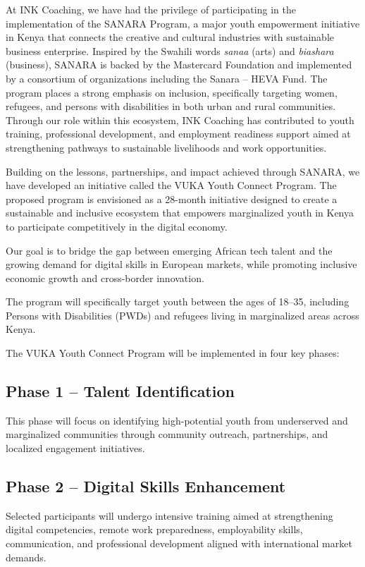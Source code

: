 \documentclass[11pt,a4paper]{article}
\begin{document}
\noindent At INK Coaching, we have had the privilege of participating in the implementation of the SANARA Program, a major youth empowerment initiative in Kenya that connects the creative and cultural industries with sustainable business enterprise. Inspired by the Swahili words \emph{sanaa} (arts) and \emph{biashara} (business), SANARA is backed by the Mastercard Foundation and implemented by a consortium of organizations including the Sanara -- HEVA Fund. The program places a strong emphasis on inclusion, specifically targeting women, refugees, and persons with disabilities in both urban and rural communities. Through our role within this ecosystem, INK Coaching has contributed to youth training, professional development, and employment readiness support aimed at strengthening pathways to sustainable livelihoods and work opportunities.

\noindent Building on the lessons, partnerships, and impact achieved through SANARA, we have developed an initiative called the VUKA Youth Connect Program. The proposed program is envisioned as a 28-month initiative designed to create a sustainable and inclusive ecosystem that empowers marginalized youth in Kenya to participate competitively in the digital economy.

\noindent Our goal is to bridge the gap between emerging African tech talent and the growing demand for digital skills in European markets, while promoting inclusive economic growth and cross-border innovation.

\noindent The program will specifically target youth between the ages of 18--35, including Persons with Disabilities (PWDs) and refugees living in marginalized areas across Kenya.

\noindent The VUKA Youth Connect Program will be implemented in four key phases:

\subsection{Phase 1 -- Talent Identification}
\noindent This phase will focus on identifying high-potential youth from underserved and marginalized communities through community outreach, partnerships, and localized engagement initiatives.

\subsection{Phase 2 -- Digital Skills Enhancement}
\noindent Selected participants will undergo intensive training aimed at strengthening digital competencies, remote work preparedness, employability skills, communication, and professional development aligned with international market demands.
\end{document}
